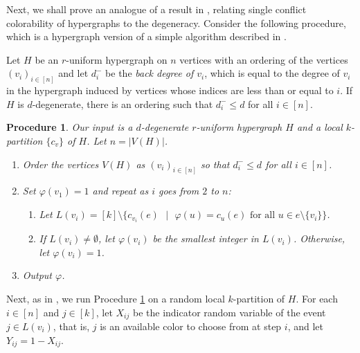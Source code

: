 \documentclass[12pt]{article}
\newtheorem{procedure}[theorem]{Procedure}
\newcommand{\setdiv}{\text{ }|\text{ }}
\newcommand{\1}{\mathds{1}}
\begin{document}


Next, we shall prove an analogue of a result in \cite{BernshteynDominikKaulMudrock}, 
relating
single conflict colorability of hypergraphs to the degeneracy.
Consider the following procedure, which is a hypergraph version of a simple algorithm described in
\cite{BernshteynDominikKaulMudrock}.

Let $H$ be an $r$-uniform hypergraph on $n$ vertices with an ordering of the vertices $(v_i)_{i\in [n]}$ and let $d_i^-$ be the \emph{back degree of $v_i$}, which is equal to the degree of $v_i$ in the hypergraph induced by vertices whose indices are less than or equal to $i$. If $H$ is $d$-degenerate, there is an ordering such that $d_i^-\leq d$ for all $i\in [n]$. 




\begin{procedure} 
\label{Procedure: (Hypergraphs) Greedyprocedure}
Our input is a $d$-degenerate $r$-uniform hypergraph $H$ and a local 
$k$-partition $\{c_v\}$ of $H$. Let $n=|V(H)|$.
\begin{enumerate}
    \item Order the vertices $V(H)$ as $(v_i)_{i\in [n]}$ so that $d_i^-\leq d$ for all $i\in [n]$.
    \item Set $\varphi(v_1)=1$ and repeat as $i$ goes from $2$ to $n$:
    \begin{enumerate}
        \item Let $L(v_i)=[k]\setminus \{c_{v_i}(e)\setdiv \varphi(u)=c_{u}(e) \text{ for all } u\in e\setminus\{v_i\}\}$.
        \item If $L(v_i)\neq \emptyset$, let $\varphi(v_i)$ be the smallest integer in $L(v_i)$. Otherwise, let $\varphi(v_i)=1$.
    \end{enumerate}
    \item Output $\varphi$.
\end{enumerate}
\end{procedure}

\vspace{\baselineskip}

Next, as in \cite{BernshteynDominikKaulMudrock}, we run Procedure \ref{Procedure: (Hypergraphs) Greedyprocedure} on a random local $k$-partition of $H$. 
For each $i\in [n]$ and $j\in [k]$, let $X_{ij}$ be the indicator random variable of the event $j\in L(v_i)$, that is, $j$ is an available color to choose from at step $i$, and let $Y_{ij}=1-X_{ij}$.
\end{document}
